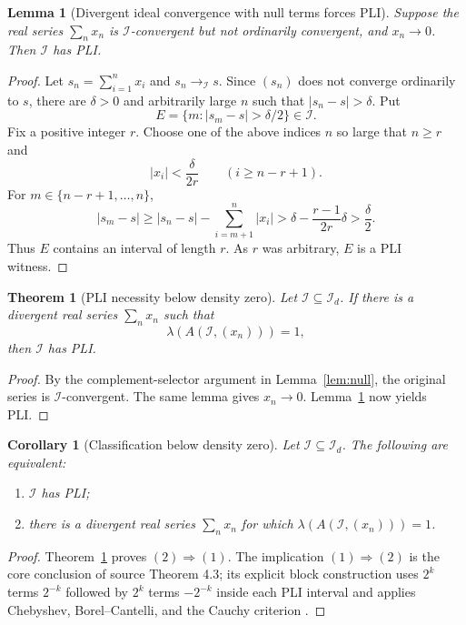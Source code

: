 \documentclass[11pt]{article}
\newtheorem{theorem}{Theorem}
\newtheorem{lemma}{Lemma}
\newtheorem{corollary}{Corollary}
\newcommand{\cI}{\mathcal I}
\newcommand{\Id}{\mathcal I_d}
\begin{document}
\begin{lemma}[Divergent ideal convergence with null terms forces PLI]
\label{lem:pli}
Suppose the real series $\sum_n x_n$ is $\cI$-convergent but not ordinarily
convergent, and $x_n\to0$.  Then $\cI$ has PLI.
\end{lemma}

\begin{proof}
Let $s_n=\sum_{i=1}^n x_i$ and $s_n\to_{\cI}s$.  Since $(s_n)$ does not
converge ordinarily to $s$, there are $\delta>0$ and arbitrarily large $n$
such that $|s_n-s|>\delta$.  Put
\[
 E=\{m:|s_m-s|>\delta/2\}\in\cI.
\]
Fix a positive integer $r$.  Choose one of the above indices $n$ so large
that $n\geq r$ and
\[
 |x_i|<\frac{\delta}{2r}\qquad(i\geq n-r+1).
\]
For $m\in\{n-r+1,\dots,n\}$,
\[
 |s_m-s|
 \geq |s_n-s|-\sum_{i=m+1}^n|x_i|
 >\delta-\frac{r-1}{2r}\delta>\frac\delta2.
\]
Thus $E$ contains an interval of length $r$.  As $r$ was arbitrary, $E$ is a
PLI witness.
\end{proof}

\begin{theorem}[PLI necessity below density zero]
\label{thm:necessity}
Let $\cI\subseteq\Id$.  If there is a divergent real series $\sum_nx_n$ such
that
\[
 \lambda(A(\cI,(x_n)))=1,
\]
then $\cI$ has PLI.
\end{theorem}

\begin{proof}
By the complement-selector argument in Lemma~\ref{lem:null}, the original
series is $\cI$-convergent.  The same lemma gives $x_n\to0$.
Lemma~\ref{lem:pli} now yields PLI.
\end{proof}

\begin{corollary}[Classification below density zero]
\label{cor:classification}
Let $\cI\subseteq\Id$.  The following are equivalent:
\begin{enumerate}
 \item $\cI$ has PLI;
 \item there is a divergent real series $\sum_nx_n$ for which
       $\lambda(A(\cI,(x_n)))=1$.
\end{enumerate}
\end{corollary}

\begin{proof}
Theorem~\ref{thm:necessity} proves $(2)\Rightarrow(1)$.  The implication
$(1)\Rightarrow(2)$ is the core conclusion of source Theorem 4.3; its explicit
block construction uses $2^k$ terms $2^{-k}$ followed by $2^k$ terms
$-2^{-k}$ inside each PLI interval and applies Chebyshev, Borel--Cantelli, and
the Cauchy criterion \cite[Theorem 4.3]{BPW}.
\end{proof}
\end{document}
